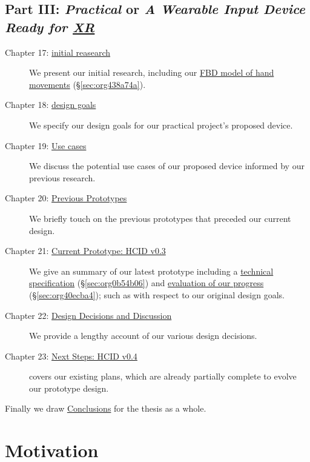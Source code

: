 \documentclass[logo,bsc,singlespacing,parskip]{infthesis}
\begin{document}
\section*{Part III: \emph{Practical} or \emph{A Wearable Input Device Ready for \hyperref[org88b0f70]{XR}}}
\label{sec:orgeac9ee4}
\begin{description}
\item[{Chapter 17: \hyperref[sec:orgfd974be]{initial reasearch}}] We present our initial research, including our \hyperref[sec:org438a74a]{FBD model of hand movements} (\S \ref{sec:org438a74a}).

\item[{Chapter 18: \hyperref[sec:org6283d51]{design goals}}] We specify our design goals for our practical project's proposed device.

\item[{Chapter 19:  \hyperref[sec:orgda9cb59]{Use cases}}] We discuss the potential use cases of our proposed  device  informed by our previous research.

\item[{Chapter 20: \hyperref[sec:orgfd8385b]{Previous Prototypes}}] We briefly touch on the previous prototypes that preceded our current design.

\item[{Chapter 21: \hyperref[sec:org0f71899]{Current Prototype: HCID v0.3}}] We give an summary of our latest prototype including a \hyperref[sec:org0b54b06]{technical specification} (\S \ref{sec:org0b54b06}) and \hyperref[sec:org40ecba4]{evaluation of our progress} (\S \ref{sec:org40ecba4}); such as with respect to our original design goals.

\item[{Chapter 22: \hyperref[sec:org385b3cd]{Design Decisions and Discussion}}] We provide a lengthy account of our various design decisions.

\item[{Chapter 23:  \hyperref[sec:org186ba86]{Next Steps: HCID v0.4}}] covers our existing plans, which are already partially complete to evolve our prototype design.
\end{description}

Finally we draw \hyperref[sec:orgb8201bd]{Conclusions} for the thesis as a whole.

\chapter*{Motivation}
\label{sec:orgb870920}
\end{document}
